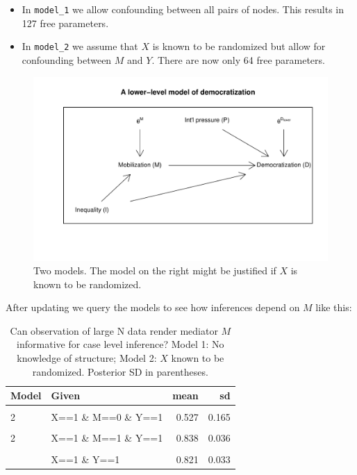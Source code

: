 \documentclass[
  12pt,
]{book}
\begin{document}
\begin{itemize}
\item
  In \texttt{model\_1} we allow confounding between all pairs of nodes. This results in 127 free parameters.
\item
  In \texttt{model\_2} we assume that \(X\) is known to be randomized but allow for confounding between \(M\) and \(Y\). There are now only 64 free parameters.
\end{itemize}

\begin{figure}

{\centering \includegraphics{ii_files/figure-latex/unnamed-chunk-38-1} 

}

\caption{Two models. The model on the right might be justified if $X$ is known to be randomized.}\label{fig:unnamed-chunk-38}
\end{figure}

After updating we query the models to see how inferences depend on \(M\) like this:

\begin{table}

\caption{\label{tab:unnamed-chunk-39}Can observation of large N data render mediator $M$ informative for case level inference? Model 1: No knowledge of structure; Model 2: $X$ known to be randomized. Posterior SD in parentheses.}
\centering
\begin{tabular}[t]{llrr}
\toprule
Model & Given & mean & sd\\
\midrule
\cellcolor{gray!6}{1} & \cellcolor{gray!6}{X==1 \& M==0 \& Y==1} & \cellcolor{gray!6}{0.498} & \cellcolor{gray!6}{0.141}\\
2 & X==1 \& M==0 \& Y==1 & 0.527 & 0.165\\
\cellcolor{gray!6}{1} & \cellcolor{gray!6}{X==1 \& M==1 \& Y==1} & \cellcolor{gray!6}{0.501} & \cellcolor{gray!6}{0.167}\\
2 & X==1 \& M==1 \& Y==1 & 0.838 & 0.036\\
\cellcolor{gray!6}{1} & \cellcolor{gray!6}{X==1 \& Y==1} & \cellcolor{gray!6}{0.501} & \cellcolor{gray!6}{0.158}\\
\addlinespace
2 & X==1 \& Y==1 & 0.821 & 0.033\\
\bottomrule
\end{tabular}
\end{table}
\end{document}
